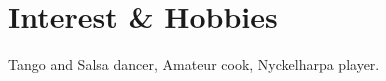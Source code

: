 \ifhobbies
\section{Interest \& Hobbies}
Tango and Salsa dancer, Amateur cook, Nyckelharpa player.
\fi


\ifreferences


\fi